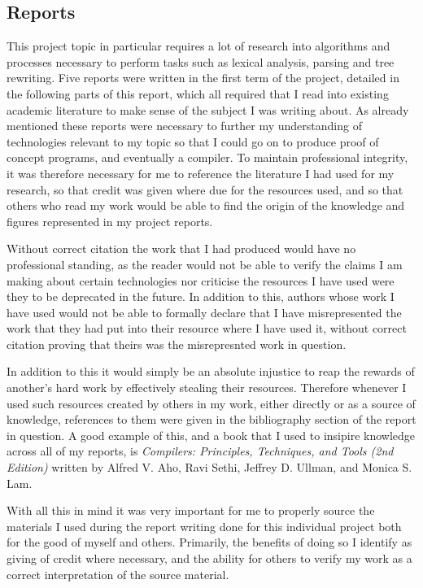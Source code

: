\documentclass[a4paper, 11pt]{article}
\begin{document}
\subsection{Reports}
This project topic in particular requires a lot of research into algorithms and processes necessary to perform tasks such as lexical analysis, parsing and tree rewriting. Five reports were written in the first term of the project, detailed in the following parts of this report, which all required that I read into existing academic literature to make sense of the subject I was writing about. As already mentioned these reports were necessary to further my understanding of technologies relevant to my topic so that I could go on to produce proof of concept programs, and eventually a compiler. To maintain professional integrity, it was therefore necessary for me to reference the literature I had used for my research, so that credit was given where due for the resources used, and so that others who read my work would be able to find the origin of the knowledge and figures represented in my project reports.

Without correct citation the work that I had produced would have no professional standing, as the reader would not be able to verify the claims I am making about certain technologies nor criticise the resources I have used were they to be deprecated in the future. In addition to this, authors whose work I have used would not be able to formally declare that I have misrepresented the work that they had put into their resource where I have used it, without correct citation proving that theirs was the misrepresnted work in question.

In addition to this it would simply be an absolute injustice to reap the rewards of another's hard work by effectively stealing their resources. Therefore whenever I used such resources created by others in my work, either directly or as a source of knowledge, references to them were given in the bibliography section of the report in question. A good example of this, and a book that I used to insipire knowledge across all of my reports, is \textit{Compilers: Principles, Techniques, and Tools (2nd Edition)} written by Alfred V. Aho, Ravi Sethi, Jeffrey D. Ullman, and Monica S. Lam.

With all this in mind it was very important for me to properly source the materials I used during the report writing done for this individual project both for the good of myself and others. Primarily, the benefits of doing so I identify as giving of credit where necessary, and the ability for others to verify my work as a correct interpretation of the source material.
\end{document}
